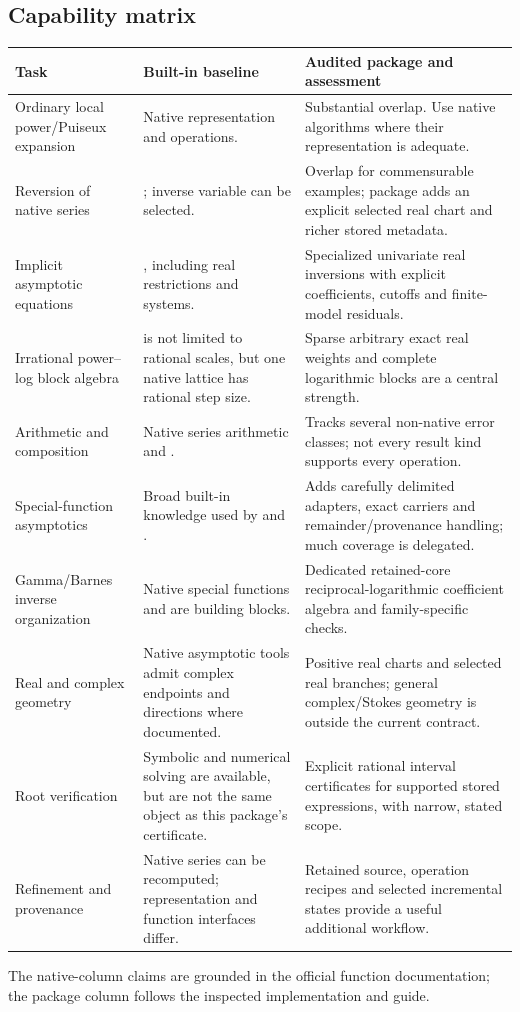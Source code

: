 \documentclass[11pt,a4paper]{article}
\newcommand{\code}[1]{\texttt{\detokenize{#1}}}
\begin{document}
\subsection{Capability matrix}
\begin{longtable}{@{}p{}p{}p{}@{}}
\toprule
Task & Built-in baseline & Audited package and assessment\\\midrule\endhead
Ordinary local power/Puiseux expansion & Native \code{Series} representation and operations. & Substantial overlap. Use native algorithms where their representation is adequate.\\
Reversion of native series & \code{InverseSeries}; inverse variable can be selected. & Overlap for commensurable examples; package adds an explicit selected real chart and richer stored metadata.\\
Implicit asymptotic equations & \code{AsymptoticSolve}, including real restrictions and systems. & Specialized univariate real inversions with explicit coefficients, cutoffs and finite-model residuals.\\
Irrational power--log block algebra & \code{Asymptotic} is not limited to rational scales, but one native \code{SeriesData} lattice has rational step size. & Sparse arbitrary exact real weights and complete logarithmic blocks are a central strength.\\
Arithmetic and composition & Native series arithmetic and \code{ComposeSeries}. & Tracks several non-native error classes; not every result kind supports every operation.\\
Special-function asymptotics & Broad built-in knowledge used by \code{Series} and \code{Asymptotic}. & Adds carefully delimited adapters, exact carriers and remainder/provenance handling; much coverage is delegated.\\
Gamma/Barnes inverse organization & Native special functions and \code{ProductLog} are building blocks. & Dedicated retained-core reciprocal-logarithmic coefficient algebra and family-specific checks.\\
Real and complex geometry & Native asymptotic tools admit complex endpoints and directions where documented. & Positive real charts and selected real branches; general complex/Stokes geometry is outside the current contract.\\
Root verification & Symbolic and numerical solving are available, but are not the same object as this package's certificate. & Explicit rational interval certificates for supported stored expressions, with narrow, stated scope.\\
Refinement and provenance & Native series can be recomputed; representation and function interfaces differ. & Retained source, operation recipes and selected incremental states provide a useful additional workflow.\\
\bottomrule
\end{longtable}
The native-column claims are grounded in the official function documentation; the package column follows the inspected implementation and guide.\cite{wa,was,wseries,wseriesdata,wis,wcompose,guide,certificates}
\end{document}
